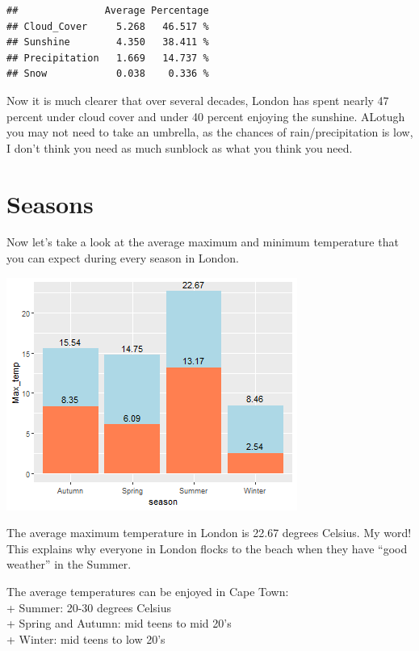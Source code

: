 \documentclass[11pt,preprint, authoryear]{elsarticle}
\let\origfigure\figure
\let\endorigfigure\endfigure
\renewenvironment{figure}[1][2] {
    \expandafter\origfigure\expandafter[H]
} {
    \endorigfigure
}
\numberwithin{equation}{section}
\numberwithin{figure}{section}
\numberwithin{table}{section}
\begin{document}
\begin{verbatim}
##               Average Percentage
## Cloud_Cover     5.268   46.517 %
## Sunshine        4.350   38.411 %
## Precipitation   1.669   14.737 %
## Snow            0.038    0.336 %
\end{verbatim}

Now it is much clearer that over several decades, London has spent
nearly 47 percent under cloud cover and under 40 percent enjoying the
sunshine. ALotugh you may not need to take an umbrella, as the chances
of rain/precipitation is low, I don't think you need as much sunblock as
what you think you need.

\hypertarget{seasons}{%
\section{Seasons}\label{seasons}}

Now let's take a look at the average maximum and minimum temperature
that you can expect during every season in London.

\begin{figure}[H]

{\centering \includegraphics{Question-2_files/figure-latex/Figure3-1} 

}

\caption{Average Season Temperature \label{Figure3}}\label{fig:Figure3}
\end{figure}

The average maximum temperature in London is 22.67 degrees Celsius. My
word! This explains why everyone in London flocks to the beach when they
have ``good weather'' in the Summer.

The average temperatures can be enjoyed in Cape Town:\\
+ Summer: 20-30 degrees Celsius\\
+ Spring and Autumn: mid teens to mid 20's\\
+ Winter: mid teens to low 20's
\end{document}
